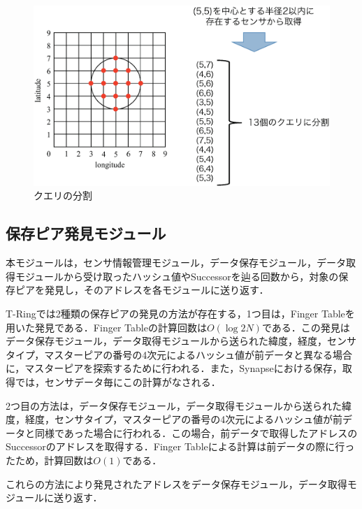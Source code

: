 \begin{figure}[htbp]
 \begin{center}
  \includegraphics[width=130mm]{./images/divide.eps}
 \end{center}
 \caption{クエリの分割}
 \label{fig:divide}
\end{figure}

\subsection{保存ピア発見モジュール}
本モジュールは，センサ情報管理モジュール，データ保存モジュール，データ取得モジュールから受け取ったハッシュ値やSuccessorを辿る回数から，対象の保存ピアを発見し，そのアドレスを各モジュールに送り返す．

T-Ringでは2種類の保存ピアの発見の方法が存在する，1つ目は，Finger Tableを用いた発見である．Finger Tableの計算回数は$O(\log{2}N)$である．この発見はデータ保存モジュール，データ取得モジュールから送られた緯度，経度，センサタイプ，マスターピアの番号の4次元によるハッシュ値が前データと異なる場合に，マスターピアを探索するために行われる．また，Synapseにおける保存，取得では，センサデータ毎にこの計算がなされる．

2つ目の方法は，データ保存モジュール，データ取得モジュールから送られた緯度，経度，センサタイプ，マスターピアの番号の4次元によるハッシュ値が前データと同様であった場合に行われる．この場合，前データで取得したアドレスのSuccessorのアドレスを取得する．Finger Tableによる計算は前データの際に行ったため，計算回数は$O(1)$である．

これらの方法により発見されたアドレスをデータ保存モジュール，データ取得モジュールに送り返す．

